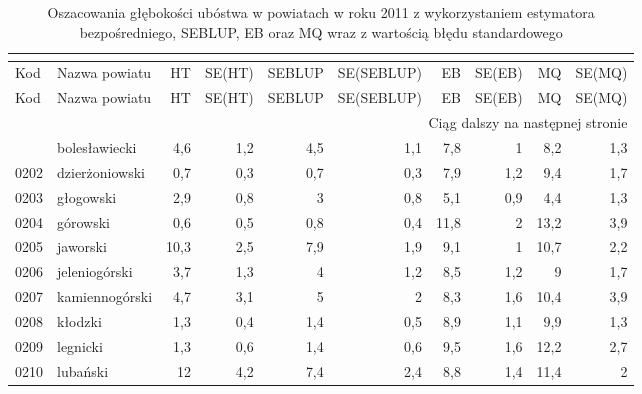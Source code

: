 \begin{center}
\footnotesize
\begin{longtable}{lp{3cm}rrrrrrrr}
\caption{Oszacowania głębokości ubóstwa w powiatach w roku 2011 z wykorzystaniem estymatora bezpośredniego, SEBLUP, EB oraz MQ wraz z wartością błędu standardowego}\\
\label{tab:pow_pgi}\\
\hline
Kod & Nazwa powiatu & HT & SE(HT) & SEBLUP & SE(SEBLUP) & EB & SE(EB) & MQ & SE(MQ) \\
  \hline
\endfirsthead
  \hline
Kod & Nazwa powiatu & HT & SE(HT) & SEBLUP & SE(SEBLUP) & EB & SE(EB) & MQ & SE(MQ) \\
  \hline
\endhead
\hline \multicolumn{10}{|r|}{{Ciąg dalszy na następnej stronie}} \\
\hline
\endfoot
\hline
\endlastfoot
\hline
0201 & bolesławiecki           & 4,6     & 1,2         & 4,5      & 1,1          & 7,8      & 1            & 8,2      & 1,3          \\
0202 & dzierżoniowski          & 0,7     & 0,3         & 0,7      & 0,3          & 7,9      & 1,2          & 9,4      & 1,7          \\
0203 & głogowski               & 2,9     & 0,8         & 3        & 0,8          & 5,1      & 0,9          & 4,4      & 1,3          \\
0204 & górowski                & 0,6     & 0,5         & 0,8      & 0,4          & 11,8     & 2            & 13,2     & 3,9          \\
0205 & jaworski                & 10,3    & 2,5         & 7,9      & 1,9          & 9,1      & 1            & 10,7     & 2,2          \\
0206 & jeleniogórski           & 3,7     & 1,3         & 4        & 1,2          & 8,5      & 1,2          & 9        & 1,7          \\
0207 & kamiennogórski          & 4,7     & 3,1         & 5        & 2            & 8,3      & 1,6          & 10,4     & 3,9          \\
0208 & kłodzki                 & 1,3     & 0,4         & 1,4      & 0,5          & 8,9      & 1,1          & 9,9      & 1,3          \\
0209 & legnicki                & 1,3     & 0,6         & 1,4      & 0,6          & 9,5      & 1,6          & 12,2     & 2,7          \\
0210 & lubański                & 12      & 4,2         & 7,4      & 2,4          & 8,8      & 1,4          & 11,4     & 2            \\

\end{longtable}
\end{center}
